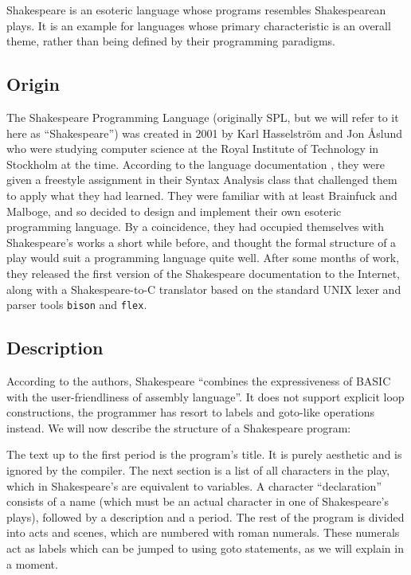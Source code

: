 Shakespeare is an esoteric language whose programs resembles Shakespearean plays. It is an example for languages whose primary characteristic is an overall theme, rather than being defined by their programming paradigms.

\subsection{Origin}

The Shakespeare Programming Language (originally SPL, but we will refer to it here as “Shakespeare”) was created in 2001 by Karl Hasselström and Jon Åslund who were studying computer science at the Royal Institute of Technology in Stockholm at the time. According to the language documentation \cite{hasselstrom2001shakespeare}, they were given a freestyle assignment in their Syntax Analysis class that challenged them to apply what they had learned. They were familiar with at least Brainfuck and Malboge, and so decided to design and implement their own esoteric programming language. By a coincidence, they had occupied themselves with Shakespeare's works a short while before, and thought the formal structure of a play would suit a programming language quite well. After some months of work, they released the first version of the Shakespeare documentation to the Internet, along with a Shakespeare-to-C translator based on the standard UNIX lexer and parser tools \texttt{bison} and \texttt{flex}.

\subsection{Description}

According to the authors, Shakespeare “combines the expressiveness of BASIC with the user-friendliness of assembly language”. It does not support explicit loop constructions, the programmer has resort to labels and goto-like operations instead. We will now describe the structure of a Shakespeare program:

The text up to the first period is the program's title. It is purely aesthetic and is ignored by the compiler. The next section is a list of all characters in the play, which in Shakespeare's are equivalent to variables. A character “declaration” consists of a name (which must be an actual character in one of Shakespeare's plays), followed by a description and a period. The rest of the program is divided into acts and scenes, which are numbered with roman numerals. These numerals act as labels which can be jumped to using goto statements, as we will explain in a moment.

